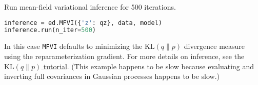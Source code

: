 Run mean-field variational inference for 500 iterations.
\begin{lstlisting}[language=Python]
inference = ed.MFVI({'z': qz}, data, model)
inference.run(n_iter=500)
\end{lstlisting}
In this case
\texttt{MFVI} defaults to minimizing the
$\text{KL}(q\|p)$ divergence measure using the reparameterization
gradient.
For more details on inference, see the \href{tut_KLqp.html}{$\text{KL}(q\|p)$ tutorial}.
(This example happens to be slow because evaluating and inverting full
covariances in Gaussian processes happens to be slow.)


